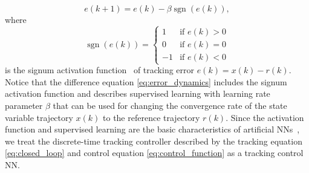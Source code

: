\begin{equation}
	\label{eq:error_dynamics}
	e(k+1) = e(k) - \beta \operatorname{sgn}(e(k)),
\end{equation}
\noindent where
\begin{equation*}
	\operatorname{sgn}(e(k)) = \begin{cases}
		1  & \text{if } e(k) > 0  \\
		0  & \text{if } e(k) = 0  \\
		-1 & \text{if } e(k) < 0
	\end{cases}
\end{equation*}
is the signum activation function~\cite{cichocki1993neural} of tracking error
$e(k) = x(k) - r(k)$. Notice that the difference equation
\eqref{eq:error_dynamics} includes the signum activation function and describes
supervised learning with learning rate parameter $\beta$ that can be used for
changing the convergence rate of the state variable trajectory $x(k)$ to the
reference trajectory $r(k)$. Since the activation function and supervised
learning are the basic characteristics of artificial
NNs~\cite{cichocki1993neural}, we treat the discrete-time tracking controller
described by the tracking equation \eqref{eq:closed_loop} and control equation
\eqref{eq:control_function} as a tracking control NN.

